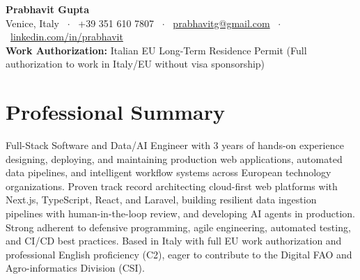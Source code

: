 \documentclass[10pt,a4paper]{article}
\begin{document}
\begin{center}
    {\Huge \textbf{Prabhavit Gupta}}\\[4pt]
    Venice, Italy \ $\cdot$ \ +39 351 610 7807 \ $\cdot$ \ \href{mailto:prabhavitg@gmail.com}{prabhavitg@gmail.com} \ $\cdot$ \ \href{https://www.linkedin.com/in/prabhavit/}{linkedin.com/in/prabhavit}\\[2pt]
    \small{\textbf{Work Authorization:} Italian EU Long-Term Residence Permit (Full authorization to work in Italy/EU without visa sponsorship)}
\end{center}

\vspace{-4pt}

\section{Professional Summary}
Full-Stack Software and Data/AI Engineer with 3 years of hands-on experience designing, deploying, and maintaining production web applications, automated data pipelines, and intelligent workflow systems across European technology organizations. Proven track record architecting cloud-first web platforms with Next.js, TypeScript, React, and Laravel, building resilient data ingestion pipelines with human-in-the-loop review, and developing AI agents in production. Strong adherent to defensive programming, agile engineering, automated testing, and CI/CD best practices. Based in Italy with full EU work authorization and professional English proficiency (C2), eager to contribute to the Digital FAO and Agro-informatics Division (CSI).

\end{document}
